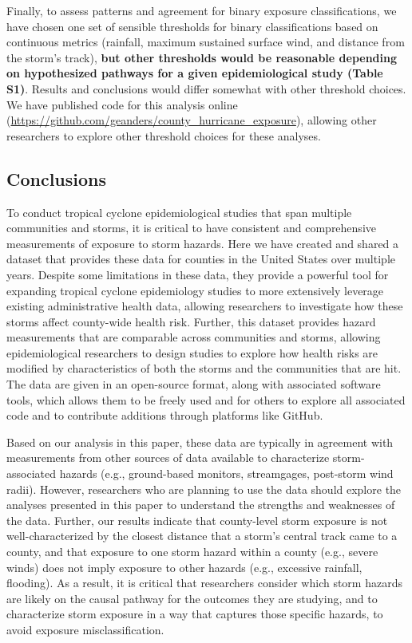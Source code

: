 Finally, to assess patterns and agreement for binary exposure classifications,
we have chosen one set of sensible thresholds for binary classifications based
on continuous metrics (rainfall, maximum sustained surface wind, and distance
from the storm's track), \textbf{but other thresholds would be reasonable
depending on hypothesized pathways for a given epidemiological study (Table
S1)}.  Results and conclusions would differ somewhat with other threshold
choices. We have published code for this analysis online
(\url{https://github.com/geanders/county_hurricane_exposure}), allowing other
researchers to explore other threshold choices for these analyses.

\subsection*{Conclusions}

To conduct tropical cyclone epidemiological studies that span multiple
communities and storms, it is critical to have consistent and comprehensive
measurements of exposure to storm hazards. Here we have created and shared a
dataset that provides these data for counties in the United States over
multiple years. Despite some limitations in these data, they provide a powerful
tool for expanding tropical cyclone epidemiology studies to more extensively
leverage existing administrative health data, allowing researchers to
investigate how these storms affect county-wide health risk.  Further, this
dataset provides hazard measurements that are comparable across communities and
storms, allowing epidemiological researchers to design studies to explore
how health risks are modified by characteristics of both the storms and the
communities that are hit. The data are given in an open-source format, along
with associated software tools, which allows them to be freely used and for
others to explore all associated code and to contribute additions through
platforms like GitHub.

Based on our analysis in this paper, these data are typically in agreement with
measurements from other sources of data available to characterize
storm-associated hazards (e.g., ground-based monitors, streamgages, post-storm
wind radii).  However, researchers who are planning to use the data
should explore the analyses presented in this paper to understand the strengths
and weaknesses of the data.  Further, our results indicate that county-level storm
exposure is not well-characterized by the closest distance that a storm's
central track came to a county, and that exposure to one storm hazard within a
county (e.g., severe winds) does not imply exposure to other hazards (e.g.,
excessive rainfall, flooding). As a result, it is critical that researchers
consider which storm hazards are likely on the causal pathway for the outcomes
they are studying, and to characterize storm exposure in a way that captures
those specific hazards, to avoid exposure misclassification. 
